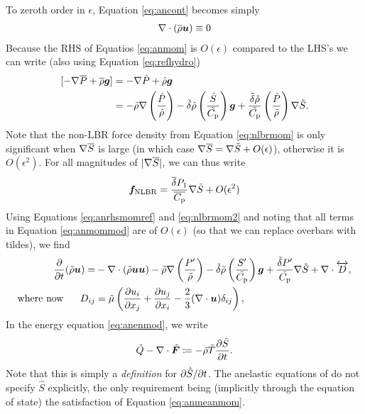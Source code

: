 \documentclass[12pt]{article}
\newcommand{\vecf}{\bm{F}}
\newcommand{\deltaref}{\overline{\delta}}
\newcommand{\cpref}{\overline{\cpcap}}
\begin{document}
To zeroth order in $\epsilon$, Equation \eqref{eq:ancont} becomes simply
\begin{align}\label{eq:ancontref}
	\nabla\cdot(\overline{\rho}\bm{u})\equiv0
\end{align}
Because the RHS of Equatios \eqref{eq:anmom} is $O(\epsilon)$ compared to the LHS's we can write (also using Equation \eqref{eq:refhydro})
\begin{align}\label{eq:anrhsmomref}
	[-\nabla \overline{P} + \overline{\rho}\bm{g}] &= -\nabla \hat{P} + \hat{\rho}\bm{g}\nonumber\\
	&= -\tilde{\rho}\nabla\left(\frac{\hat{P}}{\tilde{\rho}}\right) - \tilde{\delta} \tilde{\rho} \left(\frac{\hat{S}}{\tilde{C_{\rm{p}}}}\right) \bm{g} + \frac{\tilde{\delta}\tilde{\rho}}{\tilde{C_{\rm{p}}}} \left(\frac{\hat{P}}{\tilde{\rho}}\right)\nabla\tilde{S}.
\end{align}
Note that the non-LBR force density from Equation \eqref{eq:nlbrmom} is only significant when $\nabla\overline{S}$ is large (in which case $\nabla\overline{S}=\nabla\tilde{S}+O(\epsilon)$), otherwise it is $O(\epsilon^2)$. For all magnitudes of $|\nabla\overline{S}|$, we can thus write
\begin{align}\label{eq:nlbrmom2}
	\bm{f}_{\rm NLBR} = \frac{\deltaref P_1}{\cpref} \nabla\tilde{S} + O(\epsilon^2)
\end{align}
Using Equations \eqref{eq:anrhsmomref} and \eqref{eq:nlbrmom2} and noting that all terms in Equation \eqref{eq:anmommod} are of $O(\epsilon)$ (so that we can replace overbars with tildes), we find
\begin{subequations}\label{eq:anmomref}
	\begin{align}\label{eq:anmomrefmain}
	\frac{\partial}{\partial t}(\tilde{\rho}\bm{u})= &-\nabla\cdot(\tilde{\rho}\bm{u}\bm{u}) -\tilde{\rho}\nabla\left(\frac{P^\prime}{\tilde{\rho}}\right) - \tilde{\delta}\tilde{\rho} \left(\frac{S^\prime}{\tilde{C_{\rm{p}}}}\right) \bm{g} +\frac{\tilde{\delta} P^\prime}{\tilde{C_{\rm{p}}}} \nabla\tilde{S}+\nabla\cdot \overleftrightarrow{D},\\
	\text{where now}\ \ \ \ \  D_{ij}& = \tilde{\mu}\left(\frac{\partial u_i}{\partial x_j} + \frac{\partial u_j}{\partial x_i} - \frac{2}{3}(\nabla\cdot\bm{u})\delta_{ij}\right)\label{eq:anmomrefvisc},
\end{align}
\end{subequations}
In the energy equation \eqref{eq:anenmod}, we write 
\begin{align}\label{eq:dsdt}
	\tilde{Q} - \Div\tilde{\vecf} \define -\tilde{\rho}\tilde{T}\pderiv{\hat{S}}{t}.
\end{align}
Note that this is simply a \textit{definition} for $\partial\hat{S}/\partial t$. The anelastic equations of \citet{Gough1969} do not specify $\hat{S}$ explicitly, the only requirement being (implicitly through the equation of state) the satisfaction of Equation \eqref{eq:anmeanmom}. 
\end{document}
